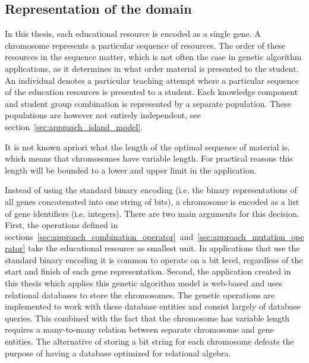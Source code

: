 \subsection{Representation of the domain}
\label{sec:approach_representation}
In this thesis, each educational resource is encoded as a single gene. A
chromosome represents a particular sequence of resources. The order of these
resources in the sequence matter, which is not often the case in genetic
algorithm applications, as it determines in what order material is presented to
the student. An individual denotes a particular teaching attempt where a particular
sequence of the education resources is presented to a student. Each knowledge
component and student group combination is represented by a separate
population. These populations are however not entirely independent, see
section~\ref{sec:approach_island_model}.

It is not known apriori what the length of the optimal sequence of material is,
which means that chromosomes have variable length. For practical reasons this
length will be bounded to a lower and upper limit in the application. 

Instead of using the standard binary encoding (i.e. the binary representations
of all genes concatenated into one string of bits), a chromosome is encoded as a list
of gene identifiers (i.e. integers). There are two main arguments for this decision.
First, the operations defined in sections~\ref{sec:approach_combination_operator}~and~\ref{sec:approach_mutation_operator}
take the educational resource as smallest unit. In applications that use the
standard binary encoding it is common to operate on a bit level, regardless of
the start and finish of each gene representation. Second, the application
created in this thesis which applies this genetic algorithm model is web-based
and uses relational databases to store the chromosomes. The genetic operations
are implemented to work with these database entities and consist largely of
database queries. This combined with the fact that the chromosome has variable
length requires a many-to-many relation between separate chromosome and gene
entities. The alternative of storing a bit string for each chromosome defeats
the purpose of having a database optimized for relational algebra.


